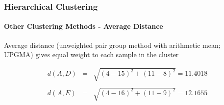 \documentclass[10pt]{beamer}
\begin{document}
\begin{frame}
\frametitle{Hierarchical Clustering}
\framesubtitle{Other Clustering Methods - Average Distance}

{\footnotesize Average distance (unweighted pair group method with
  arithmetic mean; UPGMA) gives equal weight to each sample in the
  cluster\\}

{\tiny
\begin{eqnarray*}
d(A,D) & = & \sqrt{(4-15)^{2} + (11-8)^{2}} = 11.4018\\
	&  & \\
d(A,E) & = & \sqrt{(4-16)^{2} + (11-9)^{2}} = 12.1655
\end{eqnarray*}
}

\vspace{-0.5in}
\begin{center}
\end{center}

\end{frame}
\end{document}
